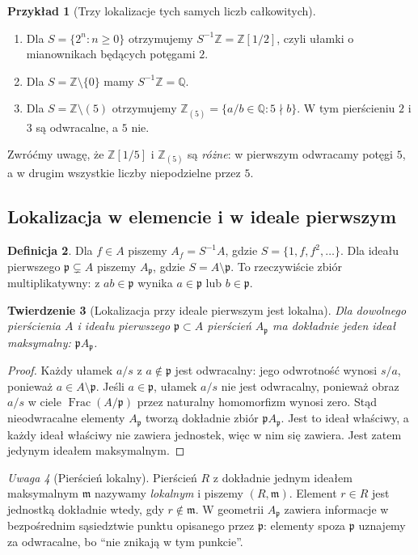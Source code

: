 \documentclass[11pt,a4paper,openany]{report}
\numberwithin{equation}{section}
\theoremstyle{plain}
\newtheorem{twierdzenie}{Twierdzenie}[section]
\theoremstyle{definition}
\newtheorem{definicja}[twierdzenie]{Definicja}
\newtheorem{przyklad}[twierdzenie]{Przykład}
\theoremstyle{remark}
\newtheorem{uwaga}[twierdzenie]{Uwaga}
\newcommand{\Z}{\mathbb Z}
\newcommand{\Q}{\mathbb Q}
\newcommand{\Frac}{\operatorname{Frac}}
\begin{document}
\begin{przyklad}[Trzy lokalizacje tych samych liczb całkowitych]
\begin{enumerate}[label=\alph*)]
\item Dla $S=\{2^n:n\ge0\}$ otrzymujemy
$S^{-1}\Z=\Z[1/2]$, czyli ułamki o mianownikach
będących potęgami $2$.
\item Dla $S=\Z\setminus\{0\}$ mamy
$S^{-1}\Z=\Q$.
\item Dla $S=\Z\setminus(5)$ otrzymujemy
$\Z_{(5)}=\{a/b\in\Q:5\nmid b\}$.
W tym pierścieniu $2$ i $3$ są odwracalne, a $5$ nie.
\end{enumerate}
Zwróćmy uwagę, że $\Z[1/5]$ i $\Z_{(5)}$ są
\emph{różne}: w pierwszym odwracamy potęgi $5$,
a w drugim wszystkie liczby niepodzielne przez $5$.
\end{przyklad}

\subsection{Lokalizacja w elemencie i w ideale pierwszym}
\begin{definicja}
Dla $f\in A$ piszemy $A_f=S^{-1}A$, gdzie
$S=\{1,f,f^2,\ldots\}$. Dla ideału pierwszego
$\mathfrak p\subsetneq A$ piszemy $A_{\mathfrak p}$,
gdzie $S=A\setminus\mathfrak p$. To rzeczywiście
zbiór multiplikatywny: z $ab\in\mathfrak p$ wynika
$a\in\mathfrak p$ lub $b\in\mathfrak p$.
\end{definicja}

\begin{twierdzenie}[Lokalizacja przy ideale pierwszym jest lokalna]
\label{tw:Ap-local}
Dla dowolnego pierścienia $A$ i ideału pierwszego
$\mathfrak p\subset A$ pierścień $A_{\mathfrak p}$
ma dokładnie jeden ideał maksymalny:
$\mathfrak p A_{\mathfrak p}$.
\end{twierdzenie}
\begin{proof}
Każdy ułamek $a/s$ z $a\notin\mathfrak p$ jest
odwracalny: jego odwrotność wynosi $s/a$, ponieważ
$a\in A\setminus\mathfrak p$. Jeśli $a\in\mathfrak p$,
ułamek $a/s$ nie jest odwracalny, ponieważ obraz
$a/s$ w ciele $\Frac(A/\mathfrak p)$ przez
naturalny homomorfizm wynosi zero. Stąd
nieodwracalne elementy $A_{\mathfrak p}$ tworzą
dokładnie zbiór $\mathfrak p A_{\mathfrak p}$.
Jest to ideał właściwy, a każdy ideał właściwy
nie zawiera jednostek, więc w nim się zawiera.
Jest zatem jedynym ideałem maksymalnym.
\end{proof}

\begin{uwaga}[Pierścień lokalny]
Pierścień $R$ z dokładnie jednym ideałem maksymalnym
$\mathfrak m$ nazywamy \emph{lokalnym} i piszemy
$(R,\mathfrak m)$. Element $r\in R$ jest jednostką
dokładnie wtedy, gdy $r\notin\mathfrak m$.
W geometrii $A_{\mathfrak p}$ zawiera informacje
w bezpośrednim sąsiedztwie punktu opisanego przez
$\mathfrak p$: elementy spoza $\mathfrak p$ uznajemy
za odwracalne, bo ``nie znikają w tym punkcie''.
\end{uwaga}
\end{document}
